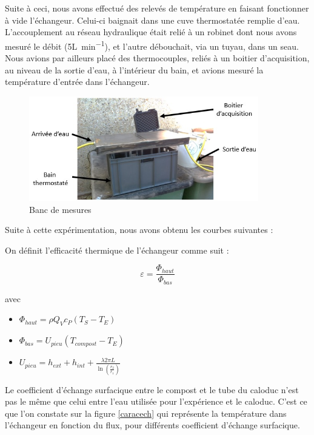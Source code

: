 \documentclass[../PS6_RapportFinal.tex]{subfiles}
\begin{document}
Suite à ceci, nous avons effectué des relevés de température en faisant fonctionner \og à vide\fg{} l'échangeur. Celui-ci baignait dans une cuve thermostatée remplie d'eau. L'accouplement au réseau hydraulique était relié à un robinet dont nous avons mesuré le débit (5\si{\liter\per\minute}), et l'autre débouchait, via un tuyau, dans un seau. Nous avions par ailleurs placé des thermocouples, reliés à un boitier d'acquisition, au niveau de la sortie d'eau, à l'intérieur du bain, et avions mesuré la température d'entrée dans l'échangeur.

\begin{figure}[!h]
\begin{center}
\includegraphics[width=10cm]{3_3_Dispositif_essais.jpg}
\caption{Banc de mesures}
\end{center}
\end{figure}
\vspace{1\baselineskip}

Suite à cette expérimentation, nous avons obtenu les courbes suivantes :


On définit l'efficacité thermique de l'échangeur comme suit :

\[\varepsilon = \frac{\Phi _{haut}}{\Phi _{bas}}\]

avec 
\begin{itemize}
\item \(\Phi_{haut} = \rho  Q_V c_P(T_S - T_E)\)
\item \(\Phi_{bas} = U_{pieu} (T_{compost} - T_E)\)
\item \(U_{pieu} = h_{ext}+h_{int}+\frac{\lambda 2\pi L}{\ln (\frac{r_2}{r_1})}\)
\end{itemize}

Le coefficient d'échange surfacique entre le compost et le tube du caloduc n'est pas le même que celui entre l'eau utilisée pour l'expérience et le caloduc.
C'est ce que l'on constate sur la figure \ref{caracech} qui représente la température dans l'échangeur en fonction du flux, pour différents coefficient d'échange surfacique.
\end{document}
